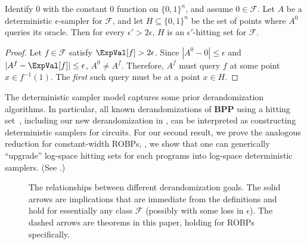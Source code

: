 \begin{proposition}
Identify $0$ with the constant $0$ function on $\{0, 1\}^n$, and assume $0 \in \mathcal{F}$. Let $A$ be a deterministic $\epsilon$-sampler for $\mathcal{F}$, and let $H \subseteq \{0, 1\}^n$ be the set of points where $A^0$ queries its oracle. Then for every $\epsilon' > 2\epsilon$, $H$ is an $\epsilon'$-hitting set for $\mathcal{F}$.
\end{proposition}

\begin{proof}
Let $f \in \mathcal{F}$ satisfy $\ExpVal[f] > 2\epsilon$. Since $|A^0 - 0| \leq \epsilon$ and $|A^f - \ExpVal[f]| \leq \epsilon$, $A^0 \neq A^f$. Therefore, $A^f$ must query $f$ at some point $x \in f^{-1}(1)$. The \emph{first} such query must be at a point $x \in H$.
\end{proof}

The deterministic sampler model captures some prior derandomization algorithms. In particular, all known derandomizations of $\mathbf{BPP}$ using a hitting set~\cite{ACR98,BF99,ACRT99,GVW11}, including our new derandomization in , can be interpreted as constructing deterministic samplers for circuits. For our second result, we prove the analogous reduction for constant-width ROBPs, \ie, we show that one can generically ``upgrade'' log-space hitting sets for such programs into log-space deterministic samplers. (See .)


\begin{figure}[h]
\begin{center}

\end{center}

\caption{The relationships between different derandomization goals. The solid arrows are implications that are immediate from the definitions and hold for essentially any class $\mathcal{F}$ (possibly with some loss in $\epsilon$). The dashed arrows are theorems in this paper, holding for ROBPs specifically.} \label{fig:implications}
\end{figure}

